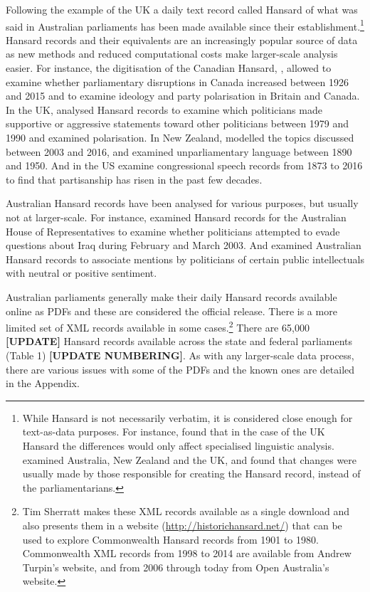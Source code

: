 \documentclass[12pt,]{article}
\begin{document}
Following the example of the UK a daily text record called Hansard of
what was said in Australian parliaments has been made available since
their establishment.\footnote{While Hansard is not necessarily verbatim,
  it is considered close enough for text-as-data purposes. For instance,
  \citet{Mollin2008} found that in the case of the UK Hansard the
  differences would only affect specialised linguistic analysis.
  \citet{Edwards2016} examined Australia, New Zealand and the UK, and
  found that changes were usually made by those responsible for creating
  the Hansard record, instead of the parliamentarians.} Hansard records
and their equivalents are an increasingly popular source of data as new
methods and reduced computational costs make larger-scale analysis
easier. For instance, the digitisation of the Canadian Hansard,
\citet{BeelenEtc2017}, allowed \citet{Whyte2017} to examine whether
parliamentary disruptions in Canada increased between 1926 and 2015 and
\citet{RheaultCochran2018} to examine ideology and party polarisation in
Britain and Canada. In the UK, \citet{Duthie2016} analysed Hansard
records to examine which politicians made supportive or aggressive
statements toward other politicians between 1979 and 1990 and
\citet{PetersonSpirling2018} examined polarisation. In New Zealand,
\citet{Curran2017} modelled the topics discussed between 2003 and 2016,
and \citet{Graham2016} examined unparliamentary language between 1890
and 1950. And in the US \citet{GentzkowShapiroTaddy2018} examine
congressional speech records from 1873 to 2016 to find that partisanship
has risen in the past few decades.

Australian Hansard records have been analysed for various purposes, but
usually not at larger-scale. For instance, \citet{Rasiah2010} examined
Hansard records for the Australian House of Representatives to examine
whether politicians attempted to evade questions about Iraq during
February and March 2003. And \citet{GansLeigh2012} examined Australian
Hansard records to associate mentions by politicians of certain public
intellectuals with neutral or positive sentiment.

Australian parliaments generally make their daily Hansard records
available online as PDFs and these are considered the official release.
There is a more limited set of XML records available in some
cases.\footnote{Tim Sherratt makes these XML records available as a
  single download and also presents them in a website
  (\url{http://historichansard.net/}) that can be used to explore
  Commonwealth Hansard records from 1901 to 1980. Commonwealth XML
  records from 1998 to 2014 are available from Andrew Turpin's website,
  and from 2006 through today from Open Australia's website.} There are
65,000 \textbf{{[}UPDATE{]}} Hansard records available across the state
and federal parliaments (Table 1) \textbf{{[}UPDATE NUMBERING{]}}. As
with any larger-scale data process, there are various issues with some
of the PDFs and the known ones are detailed in the Appendix.
\end{document}
